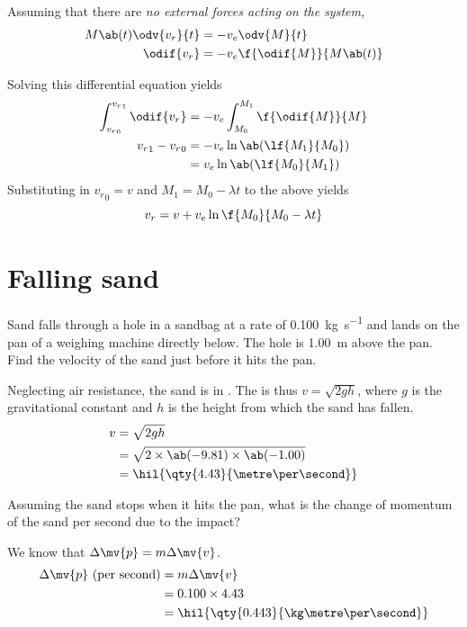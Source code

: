 Assuming that there are \it{no external forces} acting on the system,
\begin{align*}
  M\ab(t)\odv{v_r}{t} &= -v_e\odv{M}{t} \\
  \odif{v_r} &= -v_e\f{\odif{M}}{M\ab(t)}
\end{align*}

Solving this differential equation yields
\begin{align*}
  \int_{{v_r}_0}^{{v_r}_1}\odif{v_r} &=
  -v_e\int_{M_0}^{M_1}\f{\odif{M}}{M} \\
  {v_r}_1 - {v_r}_0 &= -v_e\ln\ab(\lf{M_1}{M_0}) \\
  &= v_e\ln\ab(\lf{M_0}{M_1})
\end{align*}
Substituting in \({v_r}_0 = v\) and \(M_1 = M_0 - \lambda t\) to the
above yields
\begin{equation}
  v_r = v + v_e\ln\f{M_0}{M_0 - \lambda t}
  \label{eq:rocketans}
\end{equation}

\section{Falling sand}
\begin{problem}
  Sand falls through a hole in a sandbag at a rate of
  \qty{0.100}{\kg\per\second} and lands
  on the pan of a weighing machine directly below. The hole is
  \qty{1.00}{\metre} above the pan.
  Find the velocity of the sand just before it hits the pan.
\end{problem}

Neglecting air resistance, the sand is in . The
 is thus
\(v = \sqrt{2gh}\), where \(g\) is the gravitational constant and
\(h\) is the height from which
the sand has fallen.
\begin{align*}
  v &= \sqrt{2 g h} \\
  &= \sqrt{2 \times \ab(-9.81) \times \ab(-1.00)} \\
  &= \hil{\qty{4.43}{\metre\per\second}}
\end{align*}

\begin{problem}
  Assuming the sand stops when it hits the pan, what is the change
  of momentum of the sand per second due to the impact?
\end{problem}
We know that \(\Delta\mv{p} = m\Delta\mv{v}\).
\begin{align*}
  \Delta\mv{p} \text{ (per second)} &= m\Delta\mv{v} \\
  &= 0.100 \times 4.43 \\
  &= \hil{\qty{0.443}{\kg\metre\per\second}}
\end{align*}

